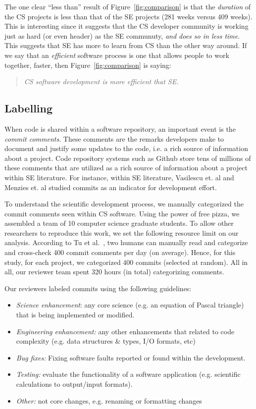 \documentclass[sigconf,review,anonymous]{acmart}
\newcommand{\bi}{\begin{itemize}}
\newcommand{\ei}{\end{itemize}}
\begin{document}
The one clear ``less than'' result of Figure~\ref{fig:comparison} is that the {\em duration} of the CS projects is less than that of the SE projects (281 weeks versus 409 weeks). 
This is interesting since it suggests
that the CS developer community is working
just as hard (or even header)
as the SE communuty, {\em and does so in less time}.
This suggests that SE has more to learn from CS than the other way around.
If we say that   an {\em efficient} software process is one that allows  people to work together, faster,  then 
Figure~\ref{fig:comparison} is saying:
\begin{quote}
{\em CS software development is  more efficient that SE.}
\end{quote} 

     



 \subsection{Labelling}
 When code is shared
within a software repository, an important event is the {\em commit comments}. These comments are the remarks developers make to document and justify some updates to the code, i.e. a rich source of information about a project. Code repository systems such as Github store tens of millions of these comments that are utilized as a rich source of information about a project within SE literature. For instance, within SE literature,  Vasilescu et. al \cite{vasilescu16_limit} and Menzies et. al \cite{xia2019sequential} studied commits as an indicator for development effort.

To understand the scientific development process, we manually categorized the commit comments seen within CS
software. 
Using the power of free pizza, we assembled a team of 10 computer science 
graduate students.
To allow other researchers to reproduce this work, we set
the following
resource limit on our analysis.
According to Tu et al.~\cite{tu2019better}, two humans can manually read and categorize
and cross-check 400 commit comments per day (on average).
Hence, for this study, for each project, we categorized 400 commits
(selected at random). 
All in all, our
reviewer team spent 320 hours (in total) categorizing comments.



 Our  reviewers
labeled commits using the following
guidelines:
\bi
\item {\em Science enhancement}: any core science (e.g. an equation of Pascal triangle) that is being implemented or modified.
\item {\em Engineering enhancement:} any other enhancements that related to code complexity (e.g. data structures \& types, I/O formats, etc) 
\item {\em Bug fixes:} Fixing software faults reported or found within the development. 
\item {\em Testing: } evaluate the functionality of a software application (e.g. scientific calculations to output/input formats).
\item
{\em Other:} not core changes, e.g. renaming or formatting changes
\ei
\end{document}
